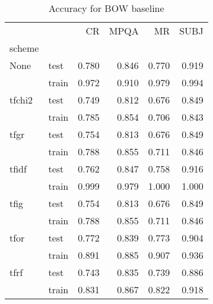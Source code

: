 \begin{table}[h]
\begin{center}

\begin{tabular}{llrrrr}
\toprule
{} &      &  CR &  MPQA &  MR &  SUBJ \\
scheme &  &            &              &            &              \\
\midrule
None & test &      0.780 &        0.846 &      0.770 &        0.919 \\
{} & train &      0.972 &        0.910 &      0.979 &        0.994 \\
tfchi2 & test &      0.749 &        0.812 &      0.676 &        0.849 \\
{} & train &      0.785 &        0.854 &      0.706 &        0.843 \\
tfgr & test &      0.754 &        0.813 &      0.676 &        0.849 \\
{} & train &      0.788 &        0.855 &      0.711 &        0.846 \\
tfidf & test &      0.762 &        0.847 &      0.758 &        0.916 \\
{} & train &      0.999 &        0.979 &      1.000 &        1.000 \\
tfig & test &      0.754 &        0.813 &      0.676 &        0.849 \\
{} & train &      0.788 &        0.855 &      0.711 &        0.846 \\
tfor & test &      0.772 &        0.839 &      0.773 &        0.904 \\
{} & train &      0.891 &        0.885 &      0.907 &        0.936 \\
tfrf & test &      0.743 &        0.835 &      0.739 &        0.886 \\
{} & train &      0.831 &        0.867 &      0.822 &        0.918 \\
\bottomrule
\end{tabular}

\caption[Accuracy for BOW baseline]{Accuracy for BOW baseline}
\label{tab:}
\end{center}
\end{table}


